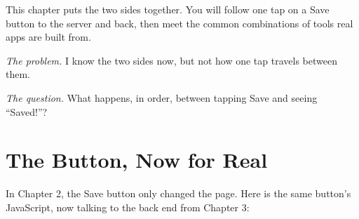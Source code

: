 
\begin{chapterintro}

This chapter puts the two sides together. You will follow one tap on a Save button to the server and back, then meet the common combinations of tools real apps are built from.

\end{chapterintro}

\emph{The problem.} I know the two sides now, but not how one tap travels between them.

\emph{The question.} What happens, in order, between tapping Save and seeing ``Saved!''?


\section{The Button, Now for Real}\label{04-following-one-tap:the-button-now-for-real}

In Chapter 2, the Save button only changed the page. Here is the same button's JavaScript, now talking to the back end from Chapter 3:

\begin{codeblock}

\begin{Shaded}
\begin{Highlighting}[]
 \OperatorTok{=}  \NormalTok{ () \{}
  \OperatorTok{=}  \NormalTok{(}\OperatorTok{,}\NormalTok{ \{}
    \OperatorTok{:} \OperatorTok{,}
    \OperatorTok{:}\NormalTok{ \{}\OperatorTok{:} \NormalTok{\}}\OperatorTok{,}
    \OperatorTok{:} \NormalTok{(\{}\OperatorTok{:} \NormalTok{\})}\OperatorTok{,}
\NormalTok{  \})}\OperatorTok{;}
  \OperatorTok{=} \NormalTok{()}\OperatorTok{;}
  \NormalTok{(}\NormalTok{)} \OperatorTok{=}
     \OperatorTok{+}\OperatorTok{;}
\NormalTok{\}}\OperatorTok{;}
\end{Highlighting}
\end{Shaded}

\end{codeblock}


